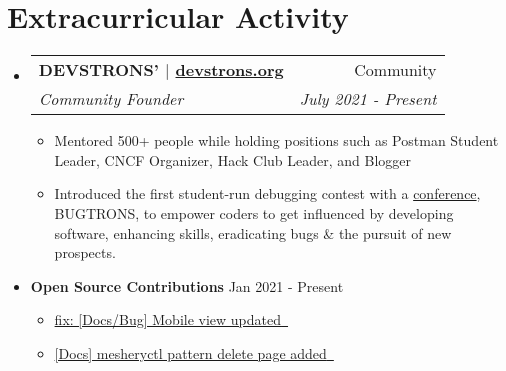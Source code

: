 \documentclass[letterpaper,11pt]{article}
\makeatletter
\newcommand{\resumeItem}[2]{
  \item\small{
    \textbf{#1}{#2 \vspace{-2pt}}
  }
}
\newcommand{\resumeSubHeading}[4]{
  \vspace{-1pt}\item
    \begin{tabular*}{0.97\textwidth}{l@{\extracolsep{\fill}}r}
      \textbf{#1} & #2 \\
      \textit{\small#3} & \textit{\small #4} \\
    \end{tabular*}\vspace{-5pt}
}
\newcommand{\resumeSubHeadingListStart}{\begin{itemize}[leftmargin=*]}
\newcommand{\resumeSubHeadingListEnd}{\end{itemize}}
\newcommand{\resumeItemListStart}{\begin{itemize}}
\newcommand{\resumeItemListEnd}{\end{itemize}\vspace{-5pt}}
\makeatother
\begin{document}
\section{Extracurricular Activity}
\resumeSubHeadingListStart
\resumeSubHeading
{DEVSTRONS' $|$ \href{https://devstrons.org}{devstrons.org}}{Community}
{Community Founder}{July 2021 - Present}
\resumeItemListStart
\resumeItem{}{Mentored 500+ people while holding positions such as Postman Student Leader, CNCF Organizer, Hack Club Leader, and Blogger}
\resumeItem{}{Introduced the first student-run debugging contest with a \href{https://bit.ly/bugtrons2-con}{conference}, BUGTRONS, to empower coders to get influenced by developing software, enhancing skills, eradicating bugs \& the pursuit of new prospects.}
\resumeItemListEnd
\vspace{2pt}
\item{
      \textbf{Open Source Contributions}{}
      \vspace{-7pt}
      \hfill
      \textbf{}{Jan 2021 - Present}
}
\resumeItemListStart
\item \href{https://github.com/jenkins-x/jx-docs/pull/3381}{{fix: [Docs/Bug] Mobile view updated} \,\faExternalLink}
\vspace{-3pt}
\item \href{https://github.com/meshery/meshery/pull/3070}{{[Docs] mesheryctl pattern delete page added} \,\faExternalLink}
\resumeItemListEnd
\resumeSubHeadingListEnd

\end{document}
